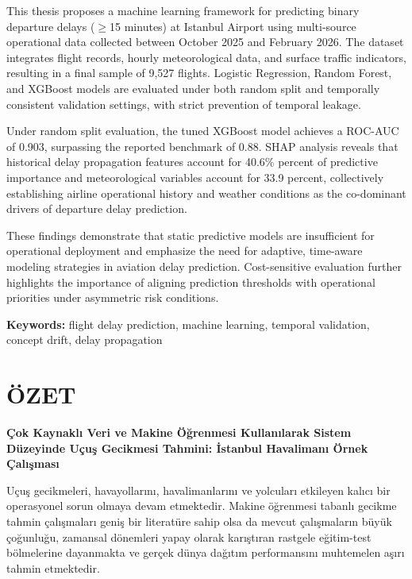 \documentclass{report}
\begin{document}
This thesis proposes a machine learning framework for predicting binary departure delays ($\geq$15 minutes) at Istanbul Airport using multi-source operational data collected between October 2025 and February 2026. The dataset integrates flight records, hourly meteorological data, and surface traffic indicators, resulting in a final sample of 9,527 flights. Logistic Regression, Random Forest, and XGBoost models are evaluated under both random split and temporally consistent validation settings, with strict prevention of temporal leakage.

Under random split evaluation, the tuned XGBoost model achieves a ROC-AUC of 0.903, surpassing the reported benchmark of 0.88. SHAP analysis reveals that historical delay propagation features account for  40.6\% percent of predictive importance and meteorological variables account for 33.9 percent, collectively establishing airline operational history and weather conditions as the co-dominant drivers of departure delay prediction.

These findings demonstrate that static predictive models are insufficient for operational deployment and emphasize the need for adaptive, time-aware modeling strategies in aviation delay prediction. Cost-sensitive evaluation further highlights the importance of aligning prediction thresholds with operational priorities under asymmetric risk conditions.

\vspace{1cm}


\textbf{Keywords:} flight delay prediction, machine learning, temporal validation, concept drift, delay propagation

\chapter*{ÖZET}

\begin{center}
\textbf{Çok Kaynaklı Veri ve Makine Öğrenmesi Kullanılarak Sistem Düzeyinde Uçuş Gecikmesi Tahmini: İstanbul Havalimanı Örnek Çalışması}
\end{center}

\vspace{1cm}

Uçuş gecikmeleri, havayollarını, havalimanlarını ve yolcuları etkileyen kalıcı bir operasyonel sorun olmaya devam etmektedir. Makine öğrenmesi tabanlı gecikme tahmin çalışmaları geniş bir literatüre sahip olsa da mevcut çalışmaların büyük çoğunluğu, zamansal dönemleri yapay olarak karıştıran rastgele eğitim-test bölmelerine dayanmakta ve gerçek dünya dağıtım performansını muhtemelen aşırı tahmin etmektedir.
\end{document}
